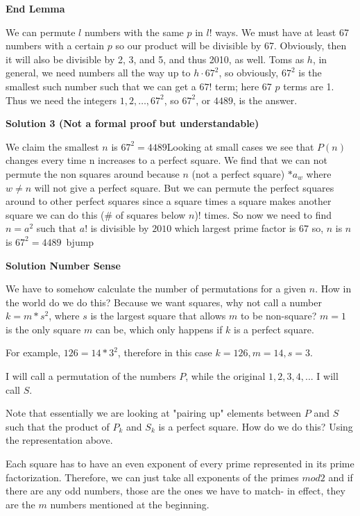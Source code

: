 \begin{enumerate}
 \textbf{End Lemma}

 We can permute $l$ numbers with the same $p$ in $l!$ ways. We must have at least 67 numbers with a certain $p$ so our product will be divisible by 67. Obviously, then it will also be divisible by 2, 3, and 5, and thus 2010, as well. Toms as $h$, in general, we need numbers all the way up to $h\cdot 67^2$, so obviously, $67^2$ is the smallest such number such that we can get a $67!$ term; here 67 $p$ terms are 1. Thus we need the integers $1, 2, \ldots, 67^2$, so $67^2$, or $\boxed{4489}$, is the answer.

 



\textbf{Solution 3 (Not a formal proof but understandable)}

We claim the smallest $n$ is $67^2 = \boxed{4489}$Looking at small cases we see that $P(n)$ changes every time n increases to a perfect square. We find that we can not permute the non squares around because $n$ (not a perfect square) $*a_w$ where $w \neq n$ will not give a perfect square. But we can permute the perfect squares around to other perfect squares since a square times a square makes another square we can do this (\# of squares below $n$)! times. So now we need to find $n = a^2$ such that $a!$ is divisible by $2010$ which largest prime factor is $67$ so, $n$ is $n$ is $67^2 = \boxed{4489}$~bjump

 



\textbf{Solution Number Sense}

We have to somehow calculate the number of permutations for a given $n$. How in the world do we do this? Because we want squares, why not call a number $k=m*s^2$, where $s$ is the largest square that allows $m$ to be non-square?  $m=1$ is the only square $m$ can be, which only happens if $k$ is a perfect square.

 For example, $126 = 14 * 3^2$, therefore in this case $k=126, m = 14, s = 3$.

 I will call a permutation of the numbers $P$, while the original $1, 2, 3, 4, ...$ I will call $S$.

 Note that essentially we are looking at "pairing up" elements between $P$ and $S$ such that the product of $P_k$ and $S_k$ is a perfect square. How do we do this? Using the representation above.

 Each square has to have an even exponent of every prime represented in its prime factorization. Therefore, we can just take all exponents of the primes $mod 2$ and if there are any odd numbers, those are the ones we have to match- in effect, they are the $m$ numbers mentioned at the beginning.


\end{enumerate}
